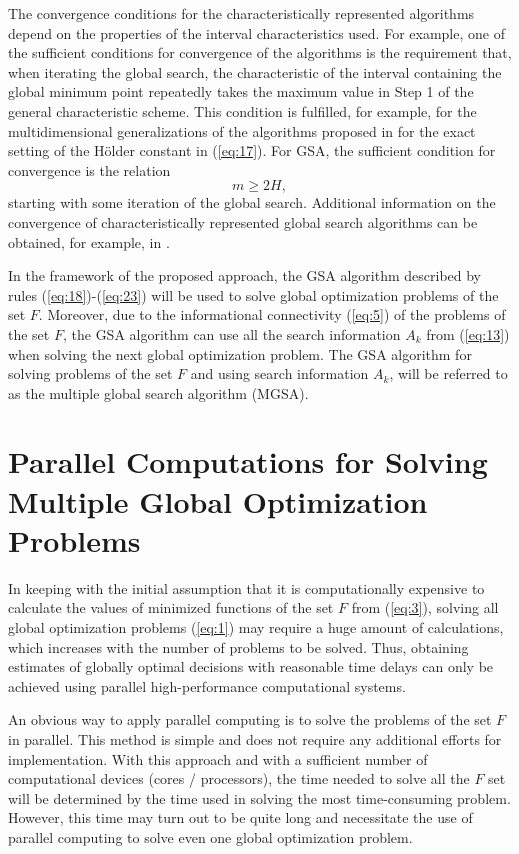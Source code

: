 \documentclass[review]{elsarticle}
\begin{document}
The convergence conditions for the characteristically represented algorithms depend on the properties of the interval characteristics used. For example, one of the sufficient conditions for convergence of the algorithms is the requirement that, when iterating the global search, the characteristic of the interval containing the global minimum point repeatedly takes the maximum value in Step 1 of the general characteristic scheme. This condition is fulfilled, for example, for the multidimensional generalizations of the algorithms proposed in \cite{c22,c23} for the exact setting of the H\"older constant in (\ref{eq:17}). For GSA, the sufficient condition for convergence is the relation \cite{c5}
\begin{equation}\label{eq:24}
m \geq 2H,
\end{equation}
starting with some iteration of the global search. Additional information on the convergence of characteristically represented global search algorithms can be obtained, for example, in \cite{c5}. 

In the framework of the proposed approach, the GSA algorithm described by rules (\ref{eq:18})-(\ref{eq:23}) will be used to solve global optimization problems of the set $F$. Moreover, due to the informational connectivity (\ref{eq:5}) of the problems of the set $F$, the GSA algorithm can use all the search information $A_k$ from (\ref{eq:13}) when solving the next global optimization problem. The GSA algorithm for solving problems of the set $F$ and using search information $A_k$, will be referred to as the multiple global search algorithm (MGSA). 



\section{Parallel Computations for Solving Multiple Global Optimization Problems}\label{sec:4}

In keeping with the initial assumption that it is computationally expensive to calculate the values of minimized functions of the set $F$ from (\ref{eq:3}), solving all global optimization problems (\ref{eq:1}) may require a huge amount of calculations, which increases with the number of problems to be solved. Thus, obtaining estimates of globally optimal decisions with reasonable time delays can only be achieved using parallel high-performance computational systems. 

An obvious way to apply parallel computing is to solve the problems of the set $F$ in parallel. This method is simple and does not require any additional efforts for implementation. With this approach and with a sufficient number of computational devices (cores / processors), the time needed to solve all the $F$ set will be determined by the time used in solving the most time-consuming problem. However, this time may turn out to be quite long and necessitate the use of parallel computing to solve even one global optimization problem.
\end{document}
